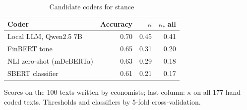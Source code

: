 \begin{table}[htbp]
\centering\small
\caption{Candidate coders for stance}\label{tab:coders-stance}
\begin{tabular}{@{}lrrr@{}}
\toprule
\textbf{Coder} & \textbf{Accuracy} & $\kappa$ & $\kappa$\textbf{, all} \\
\midrule
Local LLM, Qwen2.5 7B & 0.70 & 0.45 & 0.41 \\
FinBERT tone & 0.65 & 0.31 & 0.20 \\
NLI zero-shot (mDeBERTa) & 0.63 & 0.29 & 0.18 \\
SBERT classifier & 0.61 & 0.21 & 0.17 \\
\bottomrule
\end{tabular}
\par\smallskip\parbox{0.92\linewidth}{\footnotesize Scores on the 100 texts written by economists; last column: $\kappa$ on all 177 hand-coded texts. Thresholds and classifiers by 5-fold cross-validation.}
\end{table}
